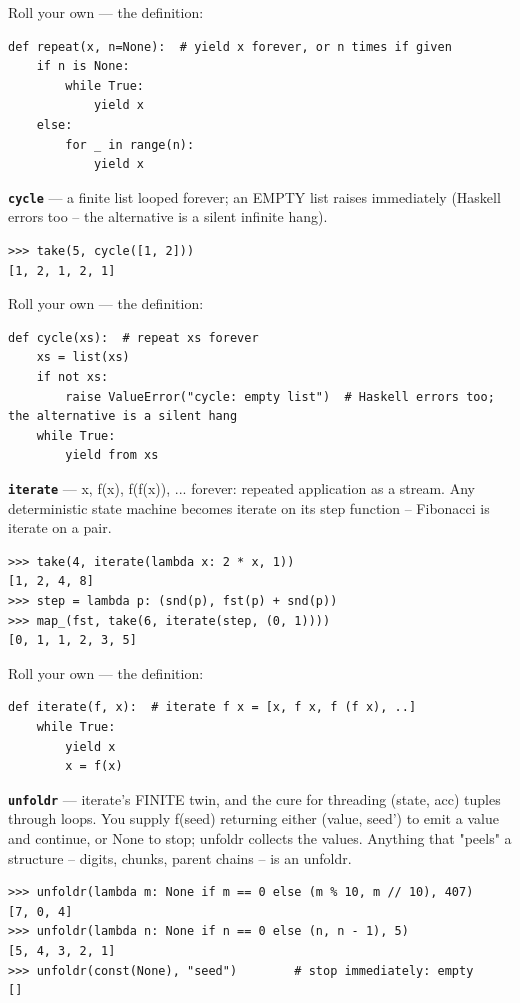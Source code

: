 \documentclass[10pt,letterpaper]{article}
\begin{document}
Roll your own --- the definition:

\begin{lstlisting}[style=ex]
def repeat(x, n=None):  # yield x forever, or n times if given
    if n is None:
        while True:
            yield x
    else:
        for _ in range(n):
            yield x
\end{lstlisting}
\textbf{\texttt{cycle}} --- a finite list looped forever; an EMPTY list raises immediately (Haskell errors too -- the alternative is a silent infinite hang).
\begin{lstlisting}[style=ex]
>>> take(5, cycle([1, 2]))
[1, 2, 1, 2, 1]
\end{lstlisting}

Roll your own --- the definition:

\begin{lstlisting}[style=ex]
def cycle(xs):  # repeat xs forever
    xs = list(xs)
    if not xs:
        raise ValueError("cycle: empty list")  # Haskell errors too; the alternative is a silent hang
    while True:
        yield from xs
\end{lstlisting}
\textbf{\texttt{iterate}} --- x, f(x), f(f(x)), ... forever: repeated application as a stream. Any deterministic state machine becomes iterate on its step function -- Fibonacci is iterate on a pair.
\begin{lstlisting}[style=ex]
>>> take(4, iterate(lambda x: 2 * x, 1))
[1, 2, 4, 8]
>>> step = lambda p: (snd(p), fst(p) + snd(p))
>>> map_(fst, take(6, iterate(step, (0, 1))))
[0, 1, 1, 2, 3, 5]
\end{lstlisting}

Roll your own --- the definition:

\begin{lstlisting}[style=ex]
def iterate(f, x):  # iterate f x = [x, f x, f (f x), ..]
    while True:
        yield x
        x = f(x)
\end{lstlisting}
\textbf{\texttt{unfoldr}} --- iterate's FINITE twin, and the cure for threading (state, acc) tuples through loops. You supply f(seed) returning either (value, seed') to emit a value and continue, or None to stop; unfoldr collects the values. Anything that "peels" a structure -- digits, chunks, parent chains -- is an unfoldr.
\begin{lstlisting}[style=ex]
>>> unfoldr(lambda m: None if m == 0 else (m % 10, m // 10), 407)
[7, 0, 4]
>>> unfoldr(lambda n: None if n == 0 else (n, n - 1), 5)
[5, 4, 3, 2, 1]
>>> unfoldr(const(None), "seed")        # stop immediately: empty
[]
\end{lstlisting}
\end{document}
